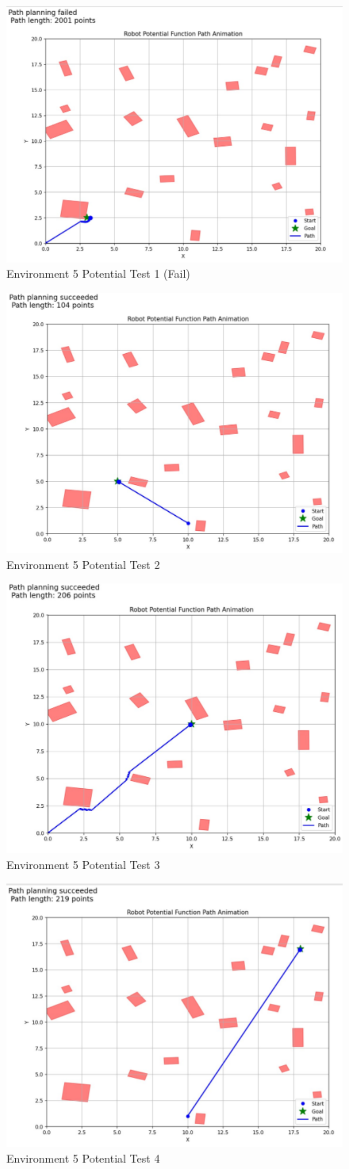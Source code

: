 \documentclass{article}
\begin{document}
\begin{figure} [H]
    \centering
    \includegraphics[width=0.5\linewidth]{latex_media/Env5PotentialTest1.jpg}
    \caption{Environment 5 Potential Test 1 (Fail)}
\end{figure}

\begin{figure} [H]
    \centering
    \includegraphics[width=0.5\linewidth]{latex_media/Env5PotentialTest2.jpg}
    \caption{Environment 5 Potential Test 2}
\end{figure}

\begin{figure} [H]
    \centering
    \includegraphics[width=0.5\linewidth]{latex_media/Env5PotentialTest3.jpg}
    \caption{Environment 5 Potential Test 3}
\end{figure}

\begin{figure} [H]
    \centering
    \includegraphics[width=0.5\linewidth]{latex_media/Env5PotentialTest4.jpg}
    \caption{Environment 5 Potential Test 4}
\end{figure}
\end{document}
